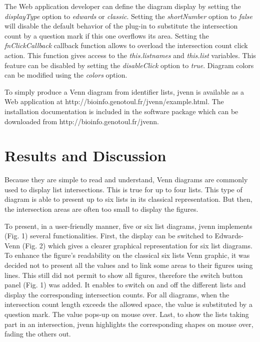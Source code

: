 \documentclass{bmcart}
\begin{document}
The Web application developer can define the diagram display by setting the
\textit{displayType} option to \textit{edwards} or \textit{classic}. Setting the
\textit{shortNumber} option to \textit{false} will disable the default behavior
of the plug-in to substitute the intersection count by a question mark if this
one overflows its area. Setting the \textit{fnClickCallback} callback function 
allows to overload the intersection count click action. This function gives
access to the \textit{this.listnames} and \textit{this.list} variables. This 
feature can be disabled by setting the \textit{disableClick} option to \textit{true}. 
Diagram colors can be modified using the \textit{colors} option.

To simply produce a Venn diagram from identifier lists, jvenn is 
available as a Web application at http://bioinfo.genotoul.fr/jvenn/example.html.
The installation documentation is included in the software package which can be
downloaded from http://bioinfo.genotoul.fr/jvenn.

\section*{Results and Discussion}

Because they are simple to read and understand, Venn diagrams are commonly used 
to display list intersections. This is true for up to four lists. This type of 
diagram is able to present up to six lists in its classical representation. But 
then, the intersection areas are often too small to display the figures. 

To present, in a user-friendly manner, five or six list diagrams, jvenn implements
(Fig. 1) several functionalities. First, the display can be switched to Edwards-Venn
(Fig. 2) which gives a clearer graphical representation for six list diagrams. To
enhance the figure's readability on the classical six lists Venn graphic, it was
decided not to present all the values and to link some areas to their figures
using lines. This still did not permit to show all figures, therefore the switch
button panel (Fig. 1) was added. It enables to switch on and off the different lists
and display the corresponding intersection counts. For all diagrams, when the 
intersection count length exceeds the allowed space, the value is substituted by
a question mark. The value pops-up on mouse over. Last, to show the lists taking
part in an intersection, jvenn highlights the corresponding shapes on mouse
over, fading the others out.
\end{document}
